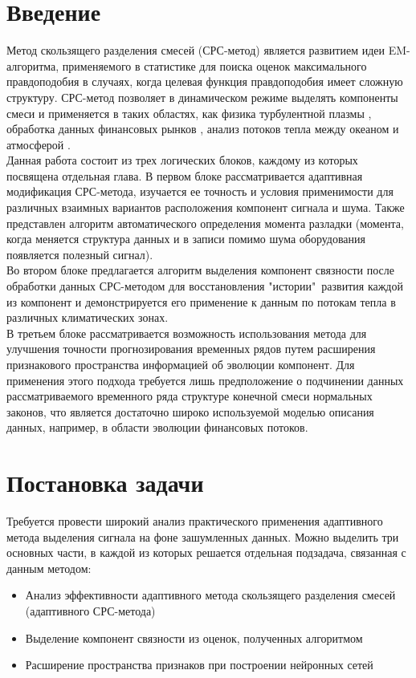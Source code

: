 \documentclass[oneside,senior,etd]{BYUPhys}
\begin{document}
{
\fixmargins
 \makepreliminarypages
\oneandhalfspace
{}
\tableofcontents
}
\section{Введение}
	Метод скользящего разделения смесей (СРС-метод) является развитием идеи EM-алгоритма, применяемого в статистике для поиска оценок максимального правдоподобия в случаях, когда целевая функция правдоподобия имеет сложную структуру. СРС-метод позволяет в динамическом режиме выделять компоненты смеси и применяется в таких областях, как физика турбулентной плазмы \cite{korolev2011book}, обработка данных финансовых рынков \cite{skvortsova2006estimation}, анализ потоков тепла между океаном и атмосферой \cite{gorshenin2020stat}.
	\\
	
	Данная работа состоит из трех логических блоков, каждому из которых посвящена отдельная глава. В первом блоке рассматривается адаптивная модификация СРС-метода, изучается ее точность и условия применимости для различных взаимных вариантов расположения компонент сигнала и шума. Также представлен алгоритм автоматического определения момента разладки (момента, когда меняется структура данных и в записи помимо шума оборудования появляется полезный сигнал).
	\\
	
	Во втором блоке предлагается алгоритм выделения компонент связности после обработки данных СРС-методом для восстановления "истории"\ развития каждой из компонент и демонстрируется его применение к данным по потокам тепла в различных климатических зонах.
	\\
	
	В третьем блоке рассматривается возможность использования метода для улучшения точности прогнозирования временных рядов путем расширения признакового пространства информацией об эволюции компонент. Для применения этого подхода требуется лишь предположение о подчинении данных рассматриваемого временного ряда структуре конечной смеси нормальных законов, что является достаточно широко используемой моделью описания данных, например, в области эволюции финансовых потоков.

	
\section{Постановка задачи}
	Требуется провести широкий анализ практического применения адаптивного метода выделения сигнала на фоне зашумленных данных. Можно выделить три основных части, в каждой из которых решается отдельная подзадача, связанная с данным методом: 
	\begin{itemize}
		\item Анализ эффективности адаптивного метода скользящего разделения смесей (адаптивного СРС-метода)
		\item Выделение компонент связности из оценок, полученных алгоритмом
		\item Расширение пространства признаков при построении нейронных сетей
	\end{itemize}
	
\end{document}
